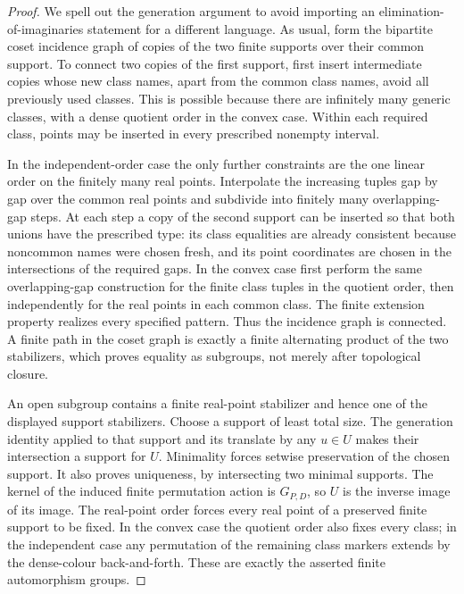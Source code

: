 \begin{proof}
We spell out the generation argument to avoid importing an
elimination-of-imaginaries statement for a different language.
As usual, form the bipartite coset incidence graph of copies of the
two finite supports over their common support. To connect two
copies of the first support, first insert intermediate copies whose
new class names, apart from the common class names, avoid all
previously used classes. This is possible because there are
infinitely many generic classes, with a dense quotient order in
the convex case. Within each required class, points may be inserted
in every prescribed nonempty interval.

In the independent-order case the only further constraints are the
one linear order on the finitely many real points. Interpolate the
increasing tuples gap by gap over the common real points and
subdivide into finitely many overlapping-gap steps. At each step
a copy of the second support can be inserted so that both unions
have the prescribed type: its class equalities are already
consistent because noncommon names were chosen fresh, and its
point coordinates are chosen in the intersections of the required
gaps. In the convex case first perform the same overlapping-gap
construction for the finite class tuples in the quotient order,
then independently for the real points in each common class.
The finite extension property realizes every specified pattern.
Thus the incidence graph is connected. A finite path in the coset
graph is exactly a finite alternating product of the two
stabilizers, which proves equality as subgroups, not merely after
topological closure.

An open subgroup contains a finite real-point stabilizer and hence
one of the displayed support stabilizers. Choose a support of least
total size. The generation identity applied to that support and
its translate by any $u\in U$ makes their intersection a support
for $U$. Minimality forces setwise preservation of the chosen
support. It also proves uniqueness, by intersecting two minimal
supports. The kernel of the induced finite permutation action is
$G_{P,D}$, so $U$ is the inverse image of its image. The real-point
order forces every real point of a preserved finite support to be
fixed. In the convex case the quotient order also fixes every
class; in the independent case any permutation of the remaining
class markers extends by the dense-colour back-and-forth. These
are exactly the asserted finite automorphism groups.
\end{proof}

